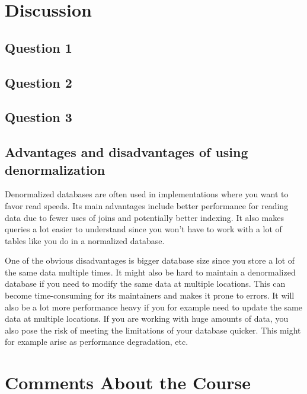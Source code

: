 \documentclass[a4paper]{scrartcl}
\begin{document}
\section{Discussion}

\subsection{Question 1}

\subsection{Question 2}

\subsection{Question 3}

\subsection{Advantages and disadvantages of using denormalization}
Denormalized databases are often used in implementations where you want to favor read speeds. Its main advantages include better performance for reading data due to fewer uses of joins and potentially better indexing. It also makes queries a lot easier to understand since you won't have to work with a lot of tables like you do in a normalized database.

One of the obvious disadvantages is bigger database size since you store a lot of the same data multiple times. It might also be hard to maintain a denormalized database if you need to modify the same data at multiple locations. This can become time-consuming for its maintainers and makes it prone to errors. It will also be a lot more performance heavy if you for example need to update the same data at multiple locations. If you are working with huge amounts of data, you also pose the risk of meeting the limitations of your database quicker. This might for example arise as performance degradation, etc.

\section{Comments About the Course}
\end{document}
